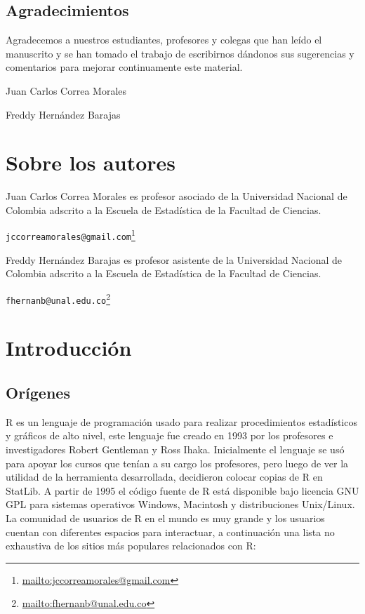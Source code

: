 \documentclass[10pt,]{krantz}
\let\proglang=\textsf
\renewcommand{\href}[2]{#2\footnote{\url{#1}}}
\let\BeginKnitrBlock\begin \let\EndKnitrBlock\end
\begin{document}
\section*{Agradecimientos}\label{agradecimientos}


Agradecemos a nuestros estudiantes, profesores y colegas que han leído
el manuscrito y se han tomado el trabajo de escribirnos dándonos sus
sugerencias y comentarios para mejorar continuamente este material.

\BeginKnitrBlock{flushright}
Juan Carlos Correa Morales

Freddy Hernández Barajas
\EndKnitrBlock{flushright}

\chapter*{Sobre los autores}\label{sobre-los-autores}


Juan Carlos Correa Morales es profesor asociado de la Universidad
Nacional de Colombia adscrito a la Escuela de Estadística de la Facultad
de Ciencias.

\href{mailto:jccorreamorales@gmail.com}{\nolinkurl{jccorreamorales@gmail.com}}

Freddy Hernández Barajas es profesor asistente de la Universidad
Nacional de Colombia adscrito a la Escuela de Estadística de la Facultad
de Ciencias.

\href{mailto:fhernanb@unal.edu.co}{\nolinkurl{fhernanb@unal.edu.co}}

\mainmatter

\chapter{\texorpdfstring{Introducción
\label{intro}}{Introducción }}\label{introduccion}

\section{Orígenes} \label{sec:origenes}

\proglang{R} es un lenguaje de programación usado para realizar
procedimientos estadísticos y gráficos de alto nivel, este lenguaje fue
creado en 1993 por los profesores e investigadores Robert Gentleman y
Ross Ihaka. Inicialmente el lenguaje se usó para apoyar los cursos que
tenían a su cargo los profesores, pero luego de ver la utilidad de la
herramienta desarrollada, decidieron colocar copias de \proglang{R} en
StatLib. A partir de 1995 el código fuente de \proglang{R} está
disponible bajo licencia GNU GPL para sistemas operativos Windows,
Macintosh y distribuciones Unix/Linux. La comunidad de usuarios de
\proglang{R} en el mundo es muy grande y los usuarios cuentan con
diferentes espacios para interactuar, a continuación una lista no
exhaustiva de los sitios más populares relacionados con \proglang{R}:
\end{document}
